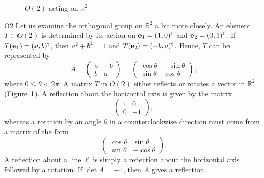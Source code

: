  
 
\begin{figure}[htb]


\begin{center}
\end{center}

\caption{$O(2)$ acting on ${\mathbb R}^2$}
\label{O2}
\end{figure}
 
 
 
\begin{example}{O2}
Let us examine the orthogonal group  on ${\mathbb R}^2$ a bit more
closely.  An element $T \in O(2)$ is determined by its action on
${\mathbf e}_1 = (1, 0)^{\rm t}$ and ${\mathbf e}_2 = (0, 1)^{\rm t}$. If
$T({\mathbf e}_1) = (a,b)^{\rm t}$, then $a^2 + b^2 = 1$ and $T({\mathbf
e}_2) = (-b, a)^{\rm t}$. Hence, $T$ can be represented by 
\[
A
=
\begin{pmatrix}
a & -b \\
b & a
\end{pmatrix}
=
\begin{pmatrix}
\cos \theta & - \sin \theta \\
\sin \theta & \cos \theta
\end{pmatrix},
\]
where $0 \leq \theta < 2 \pi$. A matrix $T$ in $O(2)$ either reflects
or rotates a vector in ${\mathbb R}^2$ (Figure~\ref{O2}). A reflection about the horizontal axis is
given by the matrix 
\[
\begin{pmatrix}
1 & 0 \\
0 & -1
\end{pmatrix},
\]
whereas a rotation by an angle $\theta$ in a counterclockwise direction
must come from a matrix of the form 
\[
\begin{pmatrix}
\cos \theta & \sin \theta \\
\sin \theta & -\cos \theta
\end{pmatrix}.
\]
A reflection about a line $\ell$ is simply a reflection about the horizontal axis followed by a rotation.  If $\det A =-1$, then $A$ gives a reflection.
\end{example}
 
